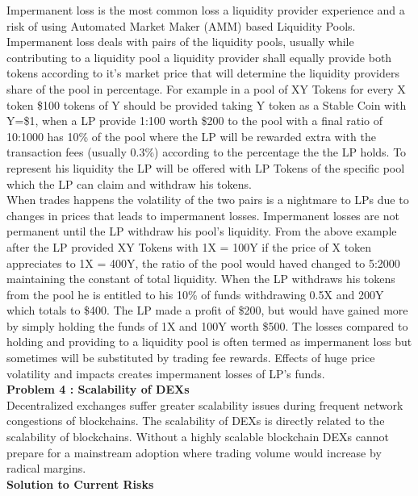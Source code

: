\documentclass[conference]{IEEEtran}
\begin{document}
Impermanent loss is the most common loss a liquidity provider experience and a risk of using Automated Market Maker (AMM) based Liquidity Pools. Impermanent loss deals with pairs of the liquidity pools, usually while contributing to a liquidity pool a liquidity provider shall equally provide both tokens according to it's market price that will determine the liquidity providers share of the pool in percentage. For example in a pool of XY Tokens for every X token \$100 tokens of Y should be provided taking Y token as a Stable Coin with Y=\$1, when a LP provide 1:100 worth \$200 to the pool with a final ratio of 10:1000 has 10\% of the pool where the LP will be rewarded extra with the transaction fees (usually 0.3\%) according to the percentage the the LP holds. To represent his liquidity the LP will be offered with LP Tokens of the specific pool which the LP can claim and withdraw his tokens.\\

When trades happens the volatility of the two pairs is a nightmare to LPs due to changes in prices that leads to impermanent losses. Impermanent losses are not permanent until the LP withdraw his pool's liquidity. From the above example after the LP provided XY Tokens with 1X = 100Y if the price of X token appreciates to 1X = 400Y, the ratio of the pool would haved changed to 5:2000 maintaining the constant of total liquidity. When the LP withdraws his tokens from the pool he is entitled to his 10\% of funds withdrawing 0.5X and 200Y which totals to \$400. The LP made a profit of \$200, but would have gained more by simply holding the funds of 1X and 100Y worth \$500. The losses compared to holding and providing to a liquidity pool is often termed as impermanent loss but sometimes will be substituted by trading fee rewards. Effects of huge price volatility and impacts creates impermanent losses of LP's funds.\\

\textbf{Problem 4 : Scalability of DEXs}\\

Decentralized exchanges suffer greater scalability issues during frequent network congestions of blockchains. The scalability of DEXs is directly related to the scalability of blockchains. Without a highly scalable blockchain DEXs cannot prepare for a mainstream adoption where trading volume would increase by radical margins.\\

\textbf{Solution to Current Risks}\\
\end{document}
